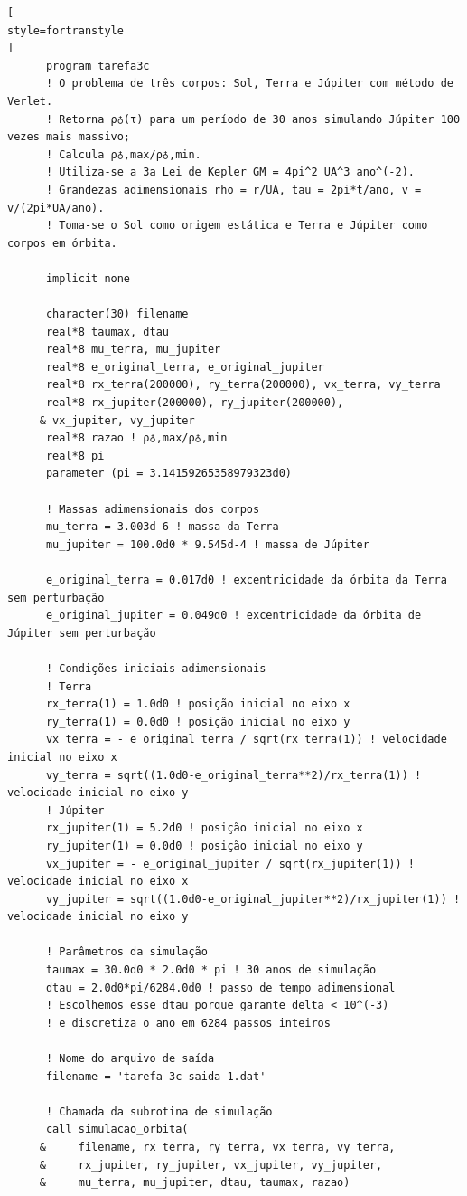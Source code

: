 \documentclass[12pt,a4paper]{article}
\begin{document}
\begin{lstlisting}[
style=fortranstyle
]
      program tarefa3c
      ! O problema de três corpos: Sol, Terra e Júpiter com método de Verlet.
      ! Retorna ρ♁(τ) para um período de 30 anos simulando Júpiter 100 vezes mais massivo;
      ! Calcula ρ♁,max/ρ♁,min.
      ! Utiliza-se a 3a Lei de Kepler GM = 4pi^2 UA^3 ano^(-2).
      ! Grandezas adimensionais rho = r/UA, tau = 2pi*t/ano, v = v/(2pi*UA/ano).
      ! Toma-se o Sol como origem estática e Terra e Júpiter como corpos em órbita.

      implicit none

      character(30) filename
      real*8 taumax, dtau
      real*8 mu_terra, mu_jupiter
      real*8 e_original_terra, e_original_jupiter
      real*8 rx_terra(200000), ry_terra(200000), vx_terra, vy_terra
      real*8 rx_jupiter(200000), ry_jupiter(200000), 
     & vx_jupiter, vy_jupiter
      real*8 razao ! ρ♁,max/ρ♁,min
      real*8 pi
      parameter (pi = 3.14159265358979323d0)

      ! Massas adimensionais dos corpos
      mu_terra = 3.003d-6 ! massa da Terra
      mu_jupiter = 100.0d0 * 9.545d-4 ! massa de Júpiter

      e_original_terra = 0.017d0 ! excentricidade da órbita da Terra sem perturbação
      e_original_jupiter = 0.049d0 ! excentricidade da órbita de Júpiter sem perturbação

      ! Condições iniciais adimensionais
      ! Terra
      rx_terra(1) = 1.0d0 ! posição inicial no eixo x
      ry_terra(1) = 0.0d0 ! posição inicial no eixo y
      vx_terra = - e_original_terra / sqrt(rx_terra(1)) ! velocidade inicial no eixo x
      vy_terra = sqrt((1.0d0-e_original_terra**2)/rx_terra(1)) ! velocidade inicial no eixo y
      ! Júpiter
      rx_jupiter(1) = 5.2d0 ! posição inicial no eixo x
      ry_jupiter(1) = 0.0d0 ! posição inicial no eixo y
      vx_jupiter = - e_original_jupiter / sqrt(rx_jupiter(1)) ! velocidade inicial no eixo x
      vy_jupiter = sqrt((1.0d0-e_original_jupiter**2)/rx_jupiter(1)) ! velocidade inicial no eixo y

      ! Parâmetros da simulação
      taumax = 30.0d0 * 2.0d0 * pi ! 30 anos de simulação
      dtau = 2.0d0*pi/6284.0d0 ! passo de tempo adimensional
      ! Escolhemos esse dtau porque garante delta < 10^(-3)
      ! e discretiza o ano em 6284 passos inteiros

      ! Nome do arquivo de saída
      filename = 'tarefa-3c-saida-1.dat'

      ! Chamada da subrotina de simulação
      call simulacao_orbita(
     &     filename, rx_terra, ry_terra, vx_terra, vy_terra,
     &     rx_jupiter, ry_jupiter, vx_jupiter, vy_jupiter,
     &     mu_terra, mu_jupiter, dtau, taumax, razao)


\end{lstlisting}
\end{document}
